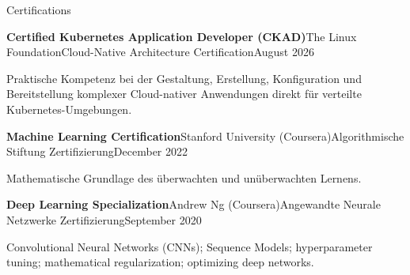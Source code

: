 \documentclass{resume} %
\newcommand{\plainitem}[1]{\item{#1}}
\begin{document}
\begin{rSection}{Certifications}

    \begin{rSubsectionNoBullet}{\bf Certified Kubernetes Application Developer (CKAD)}{The Linux Foundation}{Cloud-Native Architecture Certification}{August 2026}
        \plainitem{Praktische Kompetenz bei der Gestaltung, Erstellung, Konfiguration und Bereitstellung komplexer Cloud-nativer Anwendungen direkt für verteilte Kubernetes-Umgebungen.}
    \end{rSubsectionNoBullet}
    
    \begin{rSubsectionNoBullet}{\bf Machine Learning Certification}{Stanford University (Coursera)}{Algorithmische Stiftung Zertifizierung}{December 2022}
        \plainitem{Mathematische Grundlage des überwachten und unüberwachten Lernens.}
    \end{rSubsectionNoBullet}
    
    \begin{rSubsectionNoBullet}{\bf Deep Learning Specialization}{Andrew Ng (Coursera)}{Angewandte Neurale Netzwerke Zertifizierung}{September 2020}
        \plainitem{Convolutional Neural Networks (CNNs); Sequence Models; hyperparameter tuning; mathematical regularization; optimizing deep networks.}
    \end{rSubsectionNoBullet}

\end{rSection}
\end{document}
